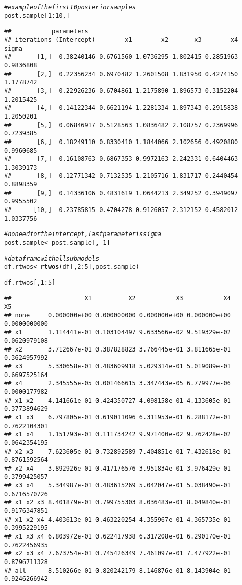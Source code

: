 \documentclass[11pt,a4paper,twoside]{book}
\makeatletter
\newcommand{\hlnum}[1]{\textcolor[rgb]{0.686,0.059,0.569}{#1}}%
\newcommand{\hlcom}[1]{\textcolor[rgb]{0.678,0.584,0.686}{\textit{#1}}}%
\newcommand{\hlopt}[1]{\textcolor[rgb]{0,0,0}{#1}}%
\newcommand{\hlstd}[1]{\textcolor[rgb]{0.345,0.345,0.345}{#1}}%
\newcommand{\hlkwb}[1]{\textcolor[rgb]{0.69,0.353,0.396}{#1}}%
\newcommand{\hlkwd}[1]{\textcolor[rgb]{0.737,0.353,0.396}{\textbf{#1}}}%
\newenvironment{kframe}{%
 \def\at@end@of@kframe{}%
 \ifinner\ifhmode%
  \def\at@end@of@kframe{\end{minipage}}%
  \begin{minipage}{\columnwidth}%
 \fi\fi%
 \def\FrameCommand##1{\hskip\@totalleftmargin \hskip-\fboxsep
 \colorbox{shadecolor}{##1}\hskip-\fboxsep
     \hskip-\linewidth \hskip-\@totalleftmargin \hskip\columnwidth}%
 \MakeFramed {\advance\hsize-\width
   \@totalleftmargin\z@ \linewidth\hsize
   \@setminipage}}%
 {\par\unskip\endMakeFramed%
 \at@end@of@kframe}
\newenvironment{knitrout}{}{} %
\makeatother
\begin{document}
\begin{knitrout}
\begin{kframe}
\begin{alltt}
\hlcom{#example of the first 10 posterior samples}
\hlstd{post.sample[}\hlnum{1}\hlopt{:}\hlnum{10}\hlstd{,]}
\end{alltt}
\begin{verbatim}
##           parameters
## iterations (Intercept)        x1        x2       x3        x4     sigma
##       [1,]  0.38240146 0.6761560 1.0736295 1.802415 0.2851963 0.9836808
##       [2,]  0.22356234 0.6970482 1.2601508 1.831950 0.4274150 1.1778742
##       [3,]  0.22926236 0.6704861 1.2175890 1.896573 0.3152204 1.2015425
##       [4,]  0.14122344 0.6621194 1.2281334 1.897343 0.2915838 1.2050201
##       [5,]  0.06846917 0.5128563 1.0836482 2.108757 0.2369996 0.7239385
##       [6,]  0.18249110 0.8330410 1.1844066 2.102656 0.4920880 0.9960685
##       [7,]  0.16108763 0.6867353 0.9972163 2.242331 0.6404463 1.3039173
##       [8,]  0.12771342 0.7132535 1.2105716 1.831717 0.2440454 0.8898359
##       [9,]  0.14336106 0.4831619 1.0644213 2.349252 0.3949097 0.9955502
##      [10,]  0.23785815 0.4704278 0.9126057 2.312152 0.4582012 1.0337756
\end{verbatim}
\begin{alltt}
\hlcom{#no need for the intercept, last parameter is sigma}
\hlstd{post.sample} \hlkwb{<-} \hlstd{post.sample[,}\hlopt{-}\hlnum{1}\hlstd{]}


\hlcom{#data frame with all submodels}
\hlstd{df.rtwos} \hlkwb{<-}\hlkwd{rtwos}\hlstd{(df[,}\hlnum{2}\hlopt{:}\hlnum{5}\hlstd{], post.sample)}

\hlstd{df.rtwos[,}\hlnum{1}\hlopt{:}\hlnum{5}\hlstd{]}
\end{alltt}
\begin{verbatim}
##                    X1          X2           X3           X4           X5
## none     0.000000e+00 0.000000000 0.000000e+00 0.000000e+00 0.0000000000
## x1       1.114441e-01 0.103104497 9.633566e-02 9.519329e-02 0.0620979108
## x2       3.712667e-01 0.387828823 3.766445e-01 3.811665e-01 0.3624957992
## x3       5.330658e-01 0.483609918 5.029314e-01 5.019089e-01 0.6697525164
## x4       2.345555e-05 0.001466615 3.347443e-05 6.779977e-06 0.0000177982
## x1 x2    4.141661e-01 0.424350727 4.098158e-01 4.133605e-01 0.3773894629
## x1 x3    6.797805e-01 0.619011096 6.311953e-01 6.288172e-01 0.7622104301
## x1 x4    1.151793e-01 0.111734242 9.971400e-02 9.762428e-02 0.0642354195
## x2 x3    7.623605e-01 0.732892589 7.404851e-01 7.432618e-01 0.8761592564
## x2 x4    3.892926e-01 0.417176576 3.951834e-01 3.976429e-01 0.3799425057
## x3 x4    5.344987e-01 0.483615269 5.042047e-01 5.038490e-01 0.6716570726
## x1 x2 x3 8.401879e-01 0.799755303 8.036483e-01 8.049840e-01 0.9176347851
## x1 x2 x4 4.403613e-01 0.463220254 4.355967e-01 4.365735e-01 0.3995229195
## x1 x3 x4 6.803972e-01 0.622417938 6.317208e-01 6.290170e-01 0.7622456935
## x2 x3 x4 7.673754e-01 0.745426349 7.461097e-01 7.477922e-01 0.8796711328
## all      8.510266e-01 0.820242179 8.146876e-01 8.143904e-01 0.9246266942
\end{verbatim}
\end{kframe}
\end{knitrout}
\end{document}
